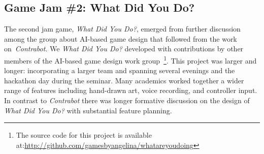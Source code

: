 \documentclass{acm_proc_article-sp}
\begin{document}

\subsection{Game Jam \#2: What Did You Do?}
The second jam game, \textit{What Did You Do?}, emerged from further discussion among the group about AI-based game design that followed from the work on~\textit{Contrabot}.
%
%
%
We \textit{What Did You Do?} developed with contributions by other members of the AI-based game design work group~\cite{treanor2015:ai-based-game}\footnote{The source code for this project is available at:\url{http://github.com/gamesbyangelina/whatareyoudoing}}.
This project was larger and longer: incorporating a larger team and spanning several evenings and the hackathon day during the seminar.
Many academics worked together a wider range of features including hand-drawn art, voice recording, and controller input.
In contrast to \textit{Contrabot} there was longer formative discussion on the design of \textit{What Did You Do?} with substantial feature planning.
\end{document}

